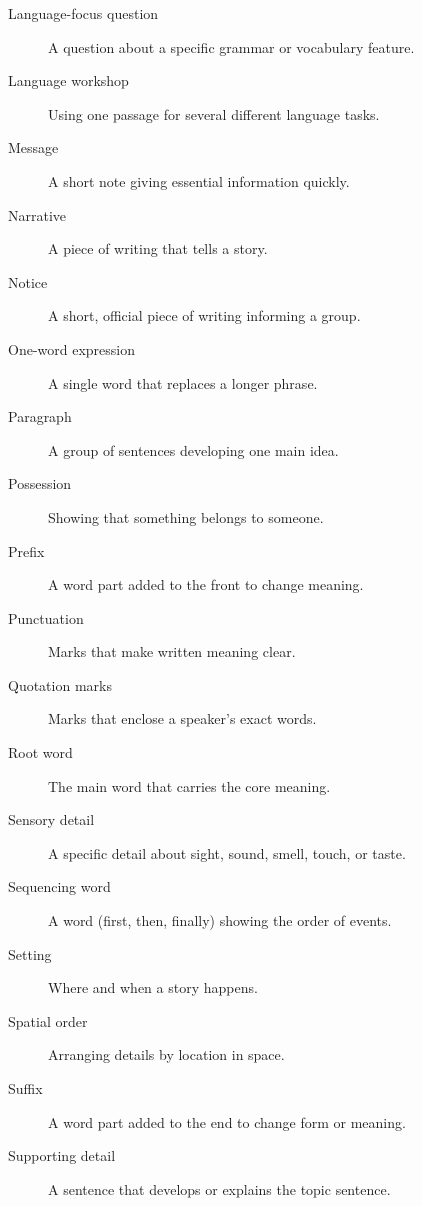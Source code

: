 \begin{description}
    \item[Language-focus question] A question about a specific grammar or vocabulary feature.

    \item[Language workshop] Using one passage for several different language tasks.

    \item[Message] A short note giving essential information quickly.

    \item[Narrative] A piece of writing that tells a story.

    \item[Notice] A short, official piece of writing informing a group.

    \item[One-word expression] A single word that replaces a longer phrase.

    \item[Paragraph] A group of sentences developing one main idea.

    \item[Possession] Showing that something belongs to someone.

    \item[Prefix] A word part added to the front to change meaning.

    \item[Punctuation] Marks that make written meaning clear.

    \item[Quotation marks] Marks that enclose a speaker's exact words.

    \item[Root word] The main word that carries the core meaning.

    \item[Sensory detail] A specific detail about sight, sound, smell, touch, or taste.

    \item[Sequencing word] A word (first, then, finally) showing the order of events.

    \item[Setting] Where and when a story happens.

    \item[Spatial order] Arranging details by location in space.

    \item[Suffix] A word part added to the end to change form or meaning.

    \item[Supporting detail] A sentence that develops or explains the topic sentence.


\end{description}
